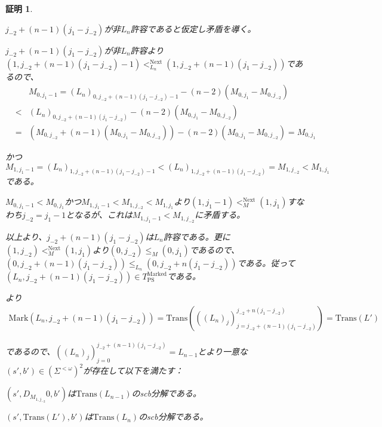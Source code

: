\documentclass[dvipdfmx,uplatex]{jsarticle}
\theoremstyle{customnonumberbreakfortheorem}
\theoremstyle{customnonumberbreakforproof}
\newtheorem{hideableproof}{証明}
\begin{document}
\begin{hideableproof}
\begin{indented}
		\item \(j_{-2}+(n-1)(j_1-j_{-2})\)が非\(L_n\)許容であると仮定し矛盾を導く。
		\begin{indented}
			\item \(j_{-2}+(n-1)(j_1-j_{-2})\)が非\(L_n\)許容より\((1,j_{-2}+(n-1)(j_1-j_{-2})-1) <_{L_n}^{\textrm{Next}} (1,j_{-2}+(n-1)(j_1-j_{-2}))\)であるので、
			\begin{eqnarray*}
			& & M_{0,j_1-1} = (L_n)_{0,j_{-2}+(n-1)(j_1-j_{-2})-1}-(n-2)(M_{0,j_1}-M_{0,j_{-2}}) \\
			& < & (L_n)_{0,j_{-2}+(n-1)(j_1-j_{-2})}-(n-2)(M_{0,j_1}-M_{0,j_{-2}}) \\
			& = & (M_{0,j_{-2}}+(n-1)(M_{0,j_1}-M_{0,j_{-2}}))-(n-2)(M_{0,j_1}-M_{0,j_{-2}}) = M_{0,j_1}
			\end{eqnarray*}
			\item かつ\(M_{1,j_1-1} = (L_n)_{1,j_{-2}+(n-1)(j_1-j_{-2})-1} < (L_n)_{1,j_{-2}+(n-1)(j_1-j_{-2})} = M_{1,j_{-2}} < M_{1,j_1}\)である。
			\item \(M_{0,j_1-1} < M_{0,j_1}\)かつ\(M_{1,j_1-1} < M_{1,j_{-2}} < M_{1,j_1}\)より\((1,j_1-1) <_M^{\textrm{Next}} (1,j_1)\)すなわち\(j_{-2} = j_1-1\)となるが、これは\(M_{1,j_1-1} < M_{1,j_{-2}}\)に矛盾する。
		\end{indented}
		\item 以上より、\(j_{-2}+(n-1)(j_1-j_{-2})\)は\(L_n\)許容である。更に\((1,j_{-2}) <_M^{\textrm{Next}} (1,j_1)\)より\((0,j_{-2}) \leq_M (0,j_1)\)であるので、\((0,j_{-2}+(n-1)(j_1-j_{-2})) \leq_{L_n} (0,j_{-2}+n(j_1-j_{-2}))\)である。従って\((L_n,j_{-2}+(n-1)(j_1-j_{-2})) \in T_{\textrm{PS}}^{\textrm{Marked}}\)である。
		\item {}より
		\begin{eqnarray*}
		\textrm{Mark}(L_n,j_{-2}+(n-1)(j_1-j_{-2})) = \textrm{Trans}(((L_n)_j)_{j=j_{-2}+(n-1)(j_1-j_{-2})}^{j_{-2}+n(j_1-j_{-2})}) = \textrm{Trans}(L')
		\end{eqnarray*}
		\item であるので、\(((L_n)_j)_{j=0}^{j_{-2}+(n-1)(j_1-j_{-2})} = L_{n-1}\)とより一意な\((s',b') \in (\Sigma^{< \omega})^2\)が存在して以下を満たす：
		\begin{penumerate}
			\item \((s',D_{M_{1,j_{-2}}} 0,b')\)は\(\textrm{Trans}(L_{n-1})\)のscb分解である。
			\item \((s',\textrm{Trans}(L'),b')\)は\(\textrm{Trans}(L_n)\)のscb分解である。
		\end{penumerate}

\end{indented}
\end{hideableproof}
\end{document}
